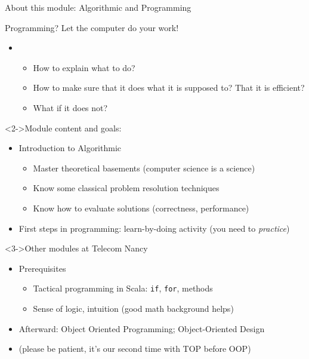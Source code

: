 \begin{frame}[squeeze]{About this module: \alert{Algorithmic and Programming}}
  \begin{block}{Programming? Let the computer do your work!}
    \begin{itemize}
    \item[] ~\vspace{-\baselineskip}
      \begin{itemize}
      \item How to explain what to do?
      \item How to make sure that it does what it is supposed to? That
        it is efficient?
      \item What if it does not?
      \end{itemize}
    \end{itemize}
  \end{block}
  \vspace{-.5\baselineskip}

  \begin{block}<2->{Module content and goals: }
    \begin{itemize}
    \item Introduction to Algorithmic
      \begin{itemize}
      \item Master theoretical basements (computer science is a science)
      \item Know some classical problem resolution techniques
      \item Know how to evaluate solutions (correctness, performance)
      \end{itemize}

    \item First steps in programming: learn-by-doing activity (you need to \textit{practice})
    \end{itemize}
  \end{block}
  \vspace{-.5\baselineskip}

  \begin{block}<3->{Other modules at Telecom Nancy}
    \begin{itemize}
    \item Prerequisites
      \begin{itemize}
      \item Tactical programming in Scala: \texttt{if}, \texttt{for}, methods
      \item Sense of logic, intuition (good math background helps)
      \end{itemize}
    \item Afterward: Object Oriented Programming; Object-Oriented Design

      \medskip
    \item[] {\small(please be patient, it's our second time with TOP before OOP)}
    \end{itemize}
  \end{block}
\end{frame}

